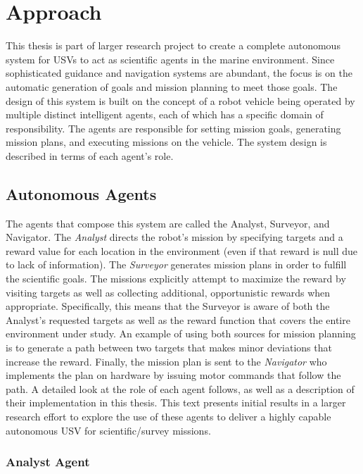 \documentclass{tamuccthesis}
\begin{document}
\section{Approach}

This thesis is part of larger research project to create a complete autonomous system for USVs to act as scientific agents in the marine environment. Since sophisticated guidance and navigation systems are abundant, the focus is on the automatic generation of goals and mission planning to meet those goals. The design of this system is built on the concept of a robot vehicle being operated by multiple distinct intelligent agents, each of which has a specific domain of responsibility. The agents are responsible for setting mission goals, generating mission plans, and executing missions on the vehicle. The system design is described in terms of each agent's role.

\subsection{Autonomous Agents}

The agents that compose this system are called the Analyst, Surveyor, and Navigator. The \textit{Analyst} directs the robot's mission by specifying targets and a reward value for each location in the environment (even if that reward is null due to lack of information). The \textit{Surveyor} generates mission plans in order to fulfill the scientific goals. The missions explicitly attempt to maximize the reward by visiting targets as well as collecting additional, opportunistic rewards when appropriate. Specifically, this means that the Surveyor is aware of both the Analyst's requested targets as well as the reward function that covers the entire environment under study. An example of using both sources for mission planning is to generate a path between two targets that makes minor deviations that increase the reward. Finally, the mission plan is sent to the \textit{Navigator} who implements the plan on hardware by issuing motor commands that follow the path. A detailed look at the role of each agent follows, as well as a description of their implementation in this thesis. This text presents initial results in a larger research effort to explore the use of these agents to deliver a highly capable autonomous USV for scientific/survey missions. 

\subsubsection{Analyst Agent}
\end{document}
